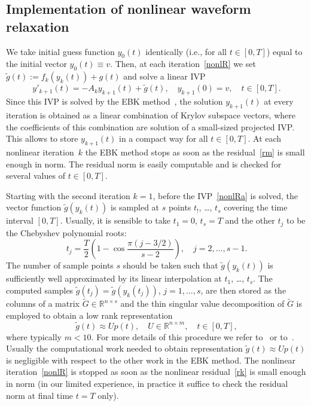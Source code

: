 \documentclass[sn-aps]{sn-jnl}
\theoremstyle{thmstyleone}%
\theoremstyle{thmstyletwo}%
\theoremstyle{thmstylethree}%
\newcommand{\Rr}{\mathbb{R}}
\begin{document}
\subsection{Implementation of nonlinear waveform relaxation}
\label{s:implem}
We take initial guess function $y_0(t)$ identically (i.e., for all $t\in[0,T]$)
equal to the initial vector $y_0(t)\equiv v$.
Then, at each iteration~\eqref{nonlR} we set $\tilde{g}(t):=f_k(y_k(t))+g(t)$ 
and solve a linear IVP
\begin{equation}
\label{nonlRa}
y'_{k+1}(t) = -A_k y_{k+1}(t) + \tilde{g}(t), \quad y_{k+1}(0)=v, 
\quad t\in[0,T].  
\end{equation}
Since this IVP is solved by the EBK method~\cite{Botchev2013},
the solution $y_{k+1}(t)$ at every iteration is obtained as a linear
combination of Krylov subspace vectors, where the coefficients of this
combination are solution of a small-sized projected IVP.
This allows to store $y_{k+1}(t)$ in a compact way for all $t\in[0,T]$.
At each nonlinear iteration~$k$ the EBK method stops as soon as
the residual~\eqref{rm} is small enough in norm.
The residual norm is easily computable and is checked for several values of $t\in[0,T]$.

Starting with the second iteration $k=1$, before the IVP~\eqref{nonlRa} is solved, 
the vector function $\tilde{g}(y_k(t))$ is sampled at $s$ points $t_!$, \dots, $t_s$ 
covering the time interval $[0,T]$.   Usually, it is sensible to take $t_1=0$,
$t_s=T$ and the other $t_j$ to be the Chebyshev polynomial roots: 
$$
t_j = \frac{T}{2}\left(1-\cos\frac{\pi(j-3/2)}{s-2}\right),\quad
j=2,\dots,s-1. 
$$
The number of sample points $s$ should be taken such that 
$\tilde{g}(y_k(t))$ is sufficiently well approximated by its 
linear interpolation at $t_1$, \dots, $t_s$.
The computed samples $\tilde{g}(t_j)=\tilde{g}(y_k(t_j))$, $j=1,\dots,s$, 
are then stored as 
the columns of a matrix $\tilde{G}\in\Rr^{n\times s}$ and the thin singular
value decomposition of $\tilde{G}$ is employed to obtain a low rank
representation
\begin{equation}
\label{Upt}  
\tilde{g}(t) \approx U p(t), \quad U\in\Rr^{n\times m}, \quad t\in[0,T],
\end{equation}
where typically $m<10$.
For more details of this procedure we refer to~\cite{Botchev2013}
or to~\cite{Kooij_ea2017}.
Usually the computational work needed to obtain representation
$\tilde{g}(t) \approx U p(t)$ is negligible with respect to the other work
in the EBK method.
The nonlinear iteration~\eqref{nonlR} is stopped as soon
as the nonlinear residual~\eqref{rk} is small enough in norm
(in our limited experience, in practice it suffice to check 
the residual norm at final time $t=T$ only).
  
\end{document}
